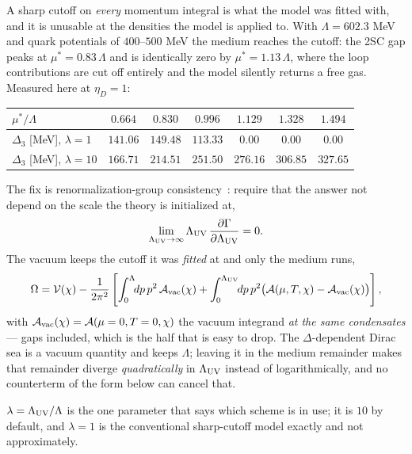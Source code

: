\documentclass[aps,prc,onecolumn,superscriptaddress,nofootinbib,10pt]{revtex4-2}
\newcommand{\Lam}{\Lambda}
\begin{document}
A sharp cutoff on \emph{every} momentum integral is what the model was fitted
with, and it is unusable at the densities the model is applied to. With
$\Lam = 602.3$ MeV and quark potentials of $400$--$500$ MeV the medium reaches
the cutoff: the 2SC gap peaks at $\mu^{*} = 0.83\,\Lam$ and is identically zero
by $\mu^{*} = 1.13\,\Lam$, where the loop contributions are cut off entirely and
the model silently returns a free gas. Measured here at $\eta_D = 1$:
%
\begin{center}
\begin{tabular}{lcccccc}
\toprule
$\mu^{*}/\Lam$ & $0.664$ & $0.830$ & $0.996$ & $1.129$ & $1.328$ & $1.494$ \\
\midrule
$\Delta_3$ [MeV], $\lambda = 1$
  & $141.06$ & $149.48$ & $113.33$ & $0.00$ & $0.00$ & $0.00$ \\
$\Delta_3$ [MeV], $\lambda = 10$
  & $166.71$ & $214.51$ & $251.50$ & $276.16$ & $306.85$ & $327.65$ \\
\bottomrule
\end{tabular}
\end{center}

The fix is renormalization-group consistency~\cite{Braun2018,Gholami2024}:
require that the answer not depend on the scale the theory is initialized at,
%
\begin{equation}
  \lim_{\Lam_{\rm UV}\to\infty}
  \Lam_{\rm UV}\,\frac{\partial \Gamma}{\partial \Lam_{\rm UV}} = 0 .
  \label{eq:rgconsistency}
\end{equation}
%
The vacuum keeps the cutoff it was \emph{fitted} at and only the medium runs,
%
\begin{equation}
  \Omega = \mathcal{V}(\chi)
  - \frac{1}{2\pi^2}\left[
      \int_0^{\Lam} \!\! dp\, p^2\, \mathcal{A}_{\rm vac}(\chi)
    + \int_0^{\Lam_{\rm UV}} \!\! dp\, p^2
      \big( \mathcal{A}(\mu, T, \chi) - \mathcal{A}_{\rm vac}(\chi) \big)
    \right] ,
  \label{eq:rgsplit}
\end{equation}
%
with $\mathcal{A}_{\rm vac}(\chi) = \mathcal{A}(\mu = 0, T = 0, \chi)$ the
vacuum integrand \emph{at the same condensates} --- gaps included, which is the
half that is easy to drop. The $\Delta$-dependent Dirac sea is a vacuum
quantity and keeps $\Lam$; leaving it in the medium remainder makes that
remainder diverge \emph{quadratically} in $\Lam_{\rm UV}$ instead of
logarithmically, and no counterterm of the form below can cancel that.

$\lambda = \Lam_{\rm UV}/\Lam$ is the one parameter that says which scheme is
in use; it is $10$ by default, and $\lambda = 1$ is the conventional
sharp-cutoff model exactly and not approximately.
\end{document}
